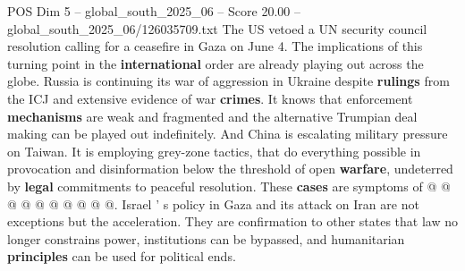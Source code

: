\begin{textsample}{POS Dim 5 – global\_south\_2025\_06 – Score 20.00 – global\_south\_2025\_06/126035709.txt}
The US vetoed a UN security council resolution calling for a ceasefire in Gaza on June 4.
The implications of this turning point in the \textbf{international} order are already playing out across the globe.
Russia is continuing its war of aggression in Ukraine despite \textbf{rulings} from the ICJ and extensive evidence of war \textbf{crimes}.
It knows that enforcement \textbf{mechanisms} are weak and fragmented and the alternative Trumpian deal making can be played out indefinitely.
And China is escalating military pressure on Taiwan.
It is employing grey-zone tactics, that do everything possible in provocation and disinformation below the threshold of open \textbf{warfare}, undeterred by \textbf{legal} commitments to peaceful resolution.
These \textbf{cases} are symptoms of @ @ @ @ @ @ @ @ @ @.
Israel ' s policy in Gaza and its attack on Iran are not exceptions but the acceleration.
They are confirmation to other states that law no longer constrains power, institutions can be bypassed, and humanitarian \textbf{principles} can be used for political ends.

\end{textsample}

